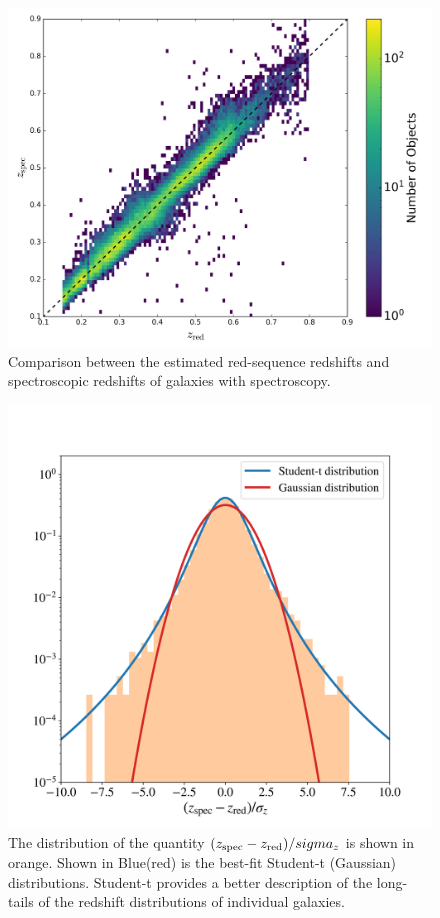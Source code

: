 \documentclass[fleqn,usenatbib,useAMS]{mnras}
\begin{document}
\begin{figure}
\includegraphics[width=\columnwidth]{figures_tmp/zphotscatter.png}
\caption{\label{fig:zphotscatter}Comparison between the estimated red-sequence redshifts and spectroscopic redshifts of galaxies with spectroscopy.} 
\label{fig:zphotscatter}
\end{figure}


\begin{figure}
    \includegraphics[width = \columnwidth]{figures_tmp/student_t.png}
    \caption{The distribution of the quantity $(z_{\rm spec} - z_{\rm red})/sigma_z$ is shown in orange. Shown in Blue(red) is the best-fit Student-t (Gaussian) distributions. Student-t provides a better description of the long-tails of the redshift distributions of individual galaxies.}
    \label{fig:student-t}
\end{figure}
\end{document}
